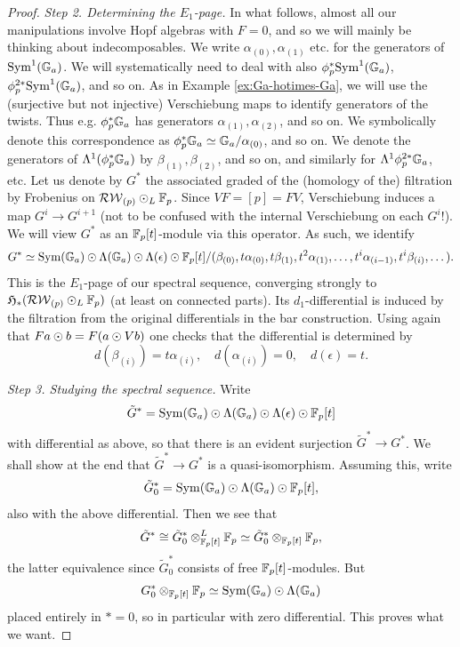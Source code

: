 \begin{proof}
\emph{Step 2. Determining the $E_1$-page.}
In what follows, almost all our manipulations involve Hopf algebras with $F=0$, and so we will mainly be thinking about indecomposables.
We write $\alpha_{(0)}, \alpha_{(1)}$ etc. for the generators of $\mathrm{Sym}^1({\mathbb G}_a)$.
We will systematically need to deal with also $\phi_p^*\mathrm{Sym}^1({\mathbb G}_a)$, $\phi_p^{2*}\mathrm{Sym}^1({\mathbb G}_a)$, and so on.
As in Example \ref{ex:Ga-hotimes-Ga}, we will use the (surjective but not injective) Verschiebung maps to identify generators of the twists.
Thus e.g. $\phi_p^* {\mathbb G}_a$ has generators $\alpha_{(1)}, \alpha_{(2)}$, and so on.
We symbolically denote this correspondence as $\phi_p^* {\mathbb G}_a \simeq {\mathbb G}_a/\alpha_{(0)}$, and so on.
We denote the generators of $\Lambda^1(\phi_p^* {\mathbb G}_a)$ by $\beta_{(1)}, \beta_{(2)}$, and so on, and similarly for $\Lambda^1 \phi_p^{2*}{\mathbb G}_a$, etc.
Let us denote by $G^*$ the associated graded of the (homology of the) filtration by Frobenius on $\mathcal{RW}_{(p)} \odot_L \mathbb{F}_p$.
Since $VF = [p] = FV$, Verschiebung induces a map $G^i \to G^{i+1}$ (not to be confused with the internal Verschiebung on each $G^i$!).
We will view $G^*$ as an $\mathbb{F}_p[t]$-module via this operator.
As such, we identify \[ G^* \simeq \mathrm{Sym}({\mathbb G}_a) \odot \Lambda({\mathbb G}_a) \odot \Lambda(\epsilon) \odot \mathbb{F}_p[t] / (\beta_{(0)}, t\alpha_{(0)}, t\beta_{(1)}, t^2\alpha_{(1)}, \dots, t^i\alpha_{(i-1)},t^i \beta_{(i)}, \dots). \]
This is the $E_1$-page of our spectral sequence, converging strongly to $\mathfrak H_*(\mathcal{RW}_{(p)} \odot_L \mathbb{F}_p)$ (at least on connected parts).
Its $d_1$-differential is induced by the filtration from the original differentials in the bar construction.
Using again that $Fa \odot b = F(a \odot Vb)$ one checks that the differential is determined by \[ d(\beta_{(i)}) = t\alpha_{(i)}, \quad d(\alpha_{(i)}) = 0, \quad d(\epsilon) = t. \]

\emph{Step 3. Studying the spectral sequence.}
Write \[ \tilde G^* = \mathrm{Sym}({\mathbb G}_a) \odot \Lambda({\mathbb G}_a) \odot \Lambda(\epsilon) \odot \mathbb{F}_p[t] \] with differential as above, so that there is an evident surjection $\tilde G^* \to G^*$.
We shall show at the end that $\tilde G^* \to G^*$ is a quasi-isomorphism.
Assuming this, write \[ \tilde G_0^* = \mathrm{Sym}({\mathbb G}_a) \odot \Lambda({\mathbb G}_a)\odot \mathbb{F}_p[t], \] also with the above differential.
Then we see that \[ \tilde G^* \cong \tilde G_0^* \otimes^L_{\mathbb{F}_p[t]} \mathbb{F}_p \simeq \tilde G_0^* \otimes_{\mathbb{F}_p[t]} \mathbb{F}_p, \] the latter equivalence since $\tilde G_0^*$ consists of free $\mathbb{F}_p[t]$-modules.
But \[ G_0^* \otimes_{\mathbb{F}_p[t]} \mathbb{F}_p \simeq \mathrm{Sym}({\mathbb G}_a) \odot \Lambda({\mathbb G}_a) \] placed entirely in $*=0$, so in particular with zero differential.
This proves what we want.


\end{proof}
